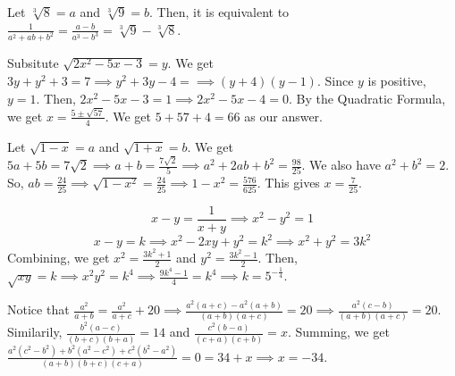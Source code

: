 \documentclass[11pt]{article}
\begin{document}

\begin{sol}
Let $\sqrt[3]{8}=a$ and $\sqrt[3]{9}=b$. Then, it is equivalent to $\frac{1}{a^2+ab+b^2}=\frac{a-b}{a^3-b^3}=\boxed{\sqrt[3]{9}-\sqrt[3]{8}}$.
\end{sol}


\begin{sol}
Subsitute $\sqrt{2x^2-5x-3}=y$. We get $3y+y^2+3=7\implies y^2+3y-4=\implies (y+4)(y-1)$. Since $y$ is positive, $y=1$. Then, $2x^2-5x-3=1\implies 2x^2-5x-4=0$. By the Quadratic Formula, we get $x=\frac{5 \pm \sqrt{57}}{4}$. We get $5+57+4=\boxed{66}$ as our answer.
\end{sol}


\begin{sol}
Let $\sqrt{1-x}=a$ and $\sqrt{1+x}=b$. We get $5a+5b=7\sqrt{2}\implies a+b=\frac{7\sqrt{2}}{5}\implies a^2+2ab+b^2 = \frac{98}{25}$. We also have $a^2+b^2=2$. So, $ab=\frac{24}{25}\implies \sqrt{1-x^2}=\frac{24}{25}\implies 1-x^2=\frac{576}{625}$. This gives $x=\boxed{\frac{7}{25}}$.
\end{sol}


\begin{sol}
$$x-y=\frac{1}{x+y}\implies x^2-y^2=1$$
$$x-y=k\implies x^2-2xy+y^2=k^2\implies x^2+y^2=3k^2$$
Combining, we get $x^2=\frac{3k^2+1}{2}$ and $y^2=\frac{3k^2-1}{2}$. Then, $\sqrt{xy}=k\implies x^2y^2=k^4\implies \frac{9k^4-1}{4}=k^4\implies k=5^{-\frac{1}{4}}$.
\end{sol}


\begin{sol}
Notice that $\frac{a^2}{a+b}=\frac{a^2}{a+c}+20\implies \frac{a^2(a+c)-a^2(a+b)}{(a+b)(a+c)}=20\implies \frac{a^2(c-b)}{(a+b)(a+c)}=20$. Similarily, $\frac{b^2(a-c)}{(b+c)(b+a)}=14$ and $\frac{c^2(b-a)}{(c+a)(c+b)}=x$. Summing, we get $\frac{a^{2}(c^2-b^2)+b^{2}(a^2-c^2)+c^2(b^2-a^2)}{(a+b)(b+c)(c+a)}=0=34+x\implies x = \boxed{-34}$.
\end{sol}
\end{document}

